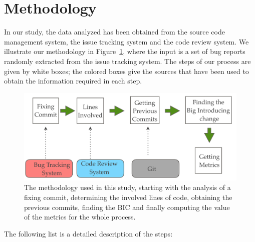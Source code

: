 \documentclass[10pt, conference]{IEEEtran}
\begin{document}
\section{Methodology}
\label{sec:methodology}

In our study, the data analyzed has been obtained from the source code management system, the issue tracking system and the code review system. We illustrate our methodology in Figure~\ref{fig:methodology}, where the input is a set of bug reports randomly extracted from the issue tracking system. The steps of our process are given by white boxes; the colored boxes give the sources that have been used to obtain the information required in each step.
\begin{figure}[ht]
\centering
\includegraphics[width=\columnwidth]{methodology.png}
\caption{The methodology used in this study, starting with the analysis of a fixing commit, determining the involved lines of code, obtaining the previous commits, finding the BIC and finally computing the value of the metrics for the whole process.}
\label{fig:methodology}       %
\end{figure}

The following list is a detailed description of the steps: 
\end{document}
